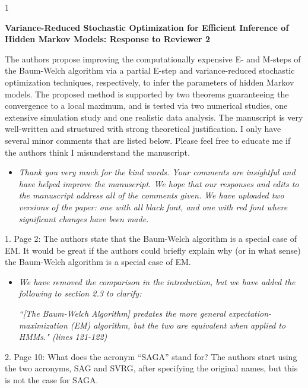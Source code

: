 \documentclass[11pt]{article}
\newcommand{\blind}{1}
\begin{document}
\blind
{
  \bigskip
  \bigskip
  \bigskip
  \begin{center}
    {\LARGE\bf Variance-Reduced Stochastic Optimization for Efficient Inference of Hidden Markov Models: Response to Reviewer 2}
  \end{center}
  \medskip
} \fi

The authors propose improving the computationally expensive E- and M-steps of the Baum-Welch algorithm via a partial E-step and variance-reduced stochastic optimization techniques, respectively, to infer the parameters of hidden Markov models. The proposed method is supported by two theorems guaranteeing the convergence to a local maximum, and is tested via two numerical studies, one extensive simulation study and one realistic data analysis. The manuscript is very well-written and structured with strong theoretical justification. I only have several minor comments that are listed below. Please feel free to educate me if the authors think I misunderstand the manuscript.

\begin{itemize}
    \item \textit{Thank you very much for the kind words. Your comments are insightful and have helped improve the manuscript. We hope that our responses and edits to the manuscript address all of the comments given. We have uploaded two versions of the paper: one with all black font, and one with red font where significant changes have been made.}
\end{itemize}

1. Page 2: The authors state that the Baum-Welch algorithm is a special case of EM. It would be great if the authors could briefly explain why (or in what sense) the Baum-Welch algorithm is a special case of EM.

\begin{itemize}
    \item \textit{We have removed the comparison in the introduction, but we have added the following to section 2.3 to clarify:}
    
    \textit{``[The Baum-Welch Algorithm] predates the more general expectation-maximization (EM) algorithm, but the two are equivalent when applied to HMMs." (lines 121-122)}
    
\end{itemize}

2. Page 10: What does the acronym “SAGA” stand for? The authors start using the two acronyms, SAG and SVRG, after specifying the original names, but this is not the case for SAGA.
\end{document}
